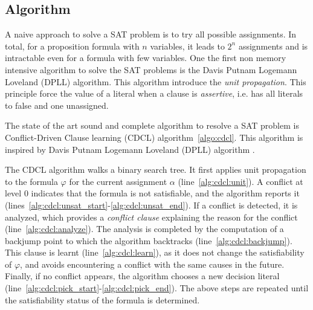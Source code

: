 \subsection{Algorithm}

A naive approach to solve a SAT problem is to try all possible assignments. In total,
for a proposition formula with $n$ variables, it leads to $2^n$ assignments and is intractable
even for a formula with few variables.
One the first non memory intensive algorithm to solve the SAT problems is the Davis Putnam Logemann Loveland (DPLL) algorithm. This algorithm introduce the \emph{unit propagation}.
This principle force the value of a literal when a clause is \emph{assertive}, i.e. 
has all literals to false and one unassigned.




The state of the art sound and complete algorithm to resolve a SAT problem is 
Conflict-Driven Clause learning (CDCL) algorithm~\ref{algo:cdcl}.
This algorithm is inspired by Davis Putnam Logemann Loveland (DPLL) algorithm \cite{dpll_62}.


The CDCL algorithm walks a binary search tree.  It first applies unit propagation to
the formula $\varphi$ for the current assignment $\alpha$ (line~\ref{alg:cdcl:unit}).
A conflict at level $0$ indicates that the formula is not satisfiable, and the algorithm
reports it (lines~\ref{alg:cdcl:unsat_start}-\ref{alg:cdcl:unsat_end}).
If a conflict is detected, it is analyzed, which provides a \emph{conflict clause} 
explaining the reason for the conflict (line~\ref{alg:cdcl:analyze}).
The analysis is completed by the computation of a
backjump point to which the algorithm backtracks (line~\ref{alg:cdcl:backjump}).
  This clause is learnt (line~\ref{alg:cdcl:learn}), as it does not change the
satisfiability of $\varphi$, and avoids encountering a conflict with the same
causes in the future.
Finally, if no conflict appears, the algorithm chooses a new decision literal 
(line~\ref{alg:cdcl:pick_start}-\ref{alg:cdcl:pick_end}).
The above steps are repeated until the satisfiability status of the formula is determined.


